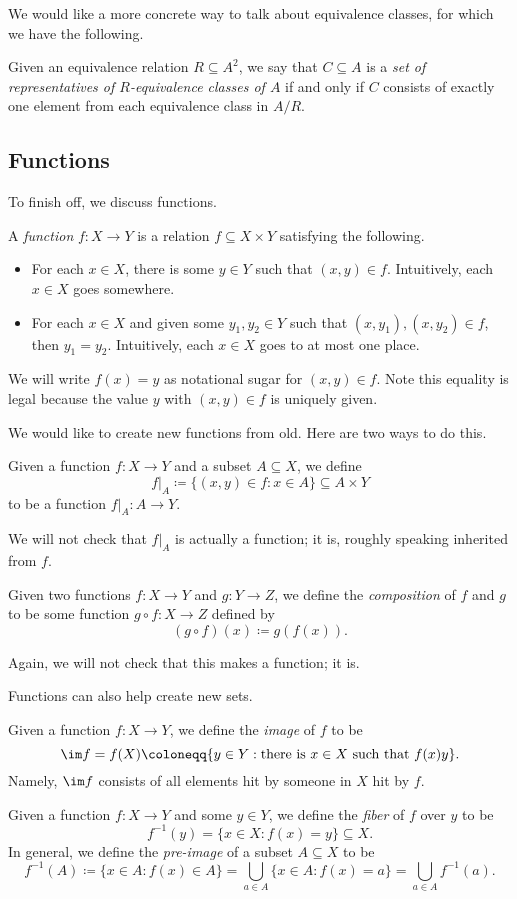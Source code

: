 \documentclass[../notes.tex]{subfiles}
\begin{document}
We would like a more concrete way to talk about equivalence classes, for which we have the following.
\begin{definition}[Representatives]
	Given an equivalence relation $R\subseteq A^2$, we say that $C\subseteq A$ is a \textit{set of representatives of $R$-equivalence classes of $A$} if and only if $C$ consists of exactly one element from each equivalence class in $A/R$.
\end{definition}

\subsection{Functions}
To finish off, we discuss functions.
\begin{definition}[Functions]
	A \textit{function} $f\colon X\to Y$ is a relation $f\subseteq X\times Y$ satisfying the following.
	\begin{itemize}
		\item For each $x\in X$, there is some $y\in Y$ such that $(x,y)\in f$. Intuitively, each $x\in X$ goes somewhere.
		\item For each $x\in X$ and given some $y_1,y_2\in Y$ such that $(x,y_1),(x,y_2)\in f$, then $y_1=y_2$. Intuitively, each $x\in X$ goes to at most one place.
	\end{itemize}
	We will write $f(x)=y$ as notational sugar for $(x,y)\in f$. Note this equality is legal because the value $y$ with $(x,y)\in f$ is uniquely given.
\end{definition}
We would like to create new functions from old. Here are two ways to do this.
\begin{definition}[Restriction]
	Given a function $f\colon X\to Y$ and a subset $A\subseteq X$, we define
	\[f|_A\coloneqq\{(x,y)\in f:x\in A\}\subseteq A\times Y\]
	to be a function $f|_A\colon A\to Y$.
\end{definition}
We will not check that $f|_A$ is actually a function; it is, roughly speaking inherited from $f$.
\begin{definition}
	Given two functions $f\colon X\to Y$ and $g\colon Y\to Z$, we define the \textit{composition} of $f$ and $g$ to be some function $g\circ f\colon X\to Z$ defined by
	\[(g\circ f)(x)\coloneqq g(f(x)).\]
\end{definition}
Again, we will not check that this makes a function; it is.

Functions can also help create new sets.
\begin{definition}[Image]
	Given a function $f\colon X\to Y$, we define the \textit{image} of $f$ to be
	\[\im f=f(X)\coloneqq \{y\in Y:\text{there is }x\in X\text{ such that }f(x)y\}.\]
	Namely, $\im f$ consists of all elements hit by someone in $X$ hit by $f$.
\end{definition}
\begin{definition}
	Given a function $f\colon X\to Y$ and some $y\in Y$, we define the \textit{fiber} of $f$ over $y$ to be
	\[f^{-1}(y)=\{x\in X:f(x)=y\}\subseteq X.\]
	In general, we define the \textit{pre-image} of a subset $A\subseteq X$ to be
	\[f^{-1}(A)\coloneqq \{x\in A:f(x)\in A\}=\bigcup_{a\in A}\{x\in A:f(x)=a\}=\bigcup_{a\in A}f^{-1}(a).\]
\end{definition}
\end{document}
